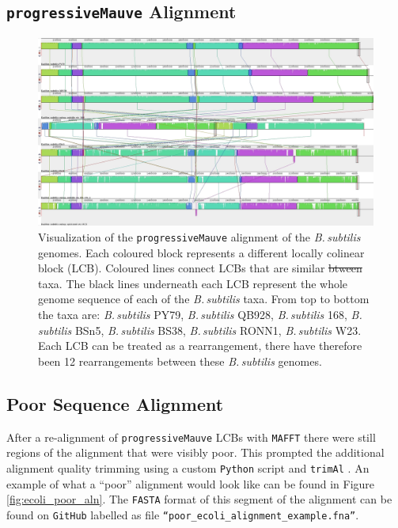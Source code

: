 \documentclass[11pt]{article}
\newcommand{\bass}{\textit{B.\,subtilis}\xspace}
\newcommand{\p}{\texttt{progressiveMauve}\xspace}
\providecommand{\DIFaddtex}[1]{{\protect\color{blue}\uwave{#1}}} %
\providecommand{\DIFdeltex}[1]{{\protect\color{red}\sout{#1}}}                      %
\providecommand{\DIFaddFL}[1]{\DIFadd{#1}} %
\providecommand{\DIFdelFL}[1]{\DIFdel{#1}} %
\providecommand{\DIFaddbeginFL}{} %
\providecommand{\DIFaddendFL}{} %
\providecommand{\DIFdelbeginFL}{} %
\providecommand{\DIFdelendFL}{} %
\providecommand{\DIFadd}[1]{\texorpdfstring{\DIFaddtex{#1}}{#1}} %
\providecommand{\DIFdel}[1]{\texorpdfstring{\DIFdeltex{#1}}{}} %
\begin{document}
	
	\subsection{\p Alignment}
	\begin{figure}[H]
		\begin{center}
			\includegraphics[width=\textwidth]{./figs/Bacillus_alignment_mauve.jpg}
			\caption{\label{fig:mauvealn} Visualization of the \p alignment of the \bass genomes. Each coloured block represents a different locally colinear block (LCB). Coloured lines connect LCBs that are similar \DIFdelbeginFL \DIFdelFL{btween }\DIFdelendFL \DIFaddbeginFL \DIFaddFL{between }\DIFaddendFL taxa. The black lines underneath each LCB represent the whole genome sequence of each of the \bass taxa. From top to bottom the taxa are: \bass PY79, \bass QB928, \bass 168, \bass BSn5, \bass BS38, \bass RONN1, \bass W23.  Each LCB can be treated as a rearrangement, there have therefore been 12 rearrangements between these \bass genomes.}
		\end{center}
	\end{figure}

\subsection{Poor Sequence Alignment}
After a re-alignment of \p LCBs with \texttt{MAFFT} there were still regions of the alignment that were visibly poor.
This prompted the additional alignment quality trimming using a custom \texttt{Python} script and \texttt{trimAl} \citep{capella2009trimal}.
An example of what a ``poor'' alignment would look like can be found in Figure \ref{fig:ecoli_poor_aln}.
The \texttt{FASTA} format of this segment of the alignment can be found on \texttt{GitHub} labelled as file \texttt{``poor\_ecoli\_alignment\_example.fna''}.
\end{document}
